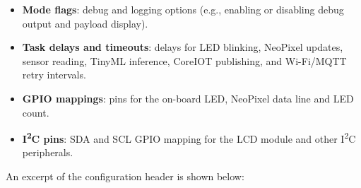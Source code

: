 \begin{itemize}
  \item \textbf{Mode flags}: debug and logging options (e.g., enabling or disabling debug output and payload display).
  \item \textbf{Task delays and timeouts}: delays for LED blinking, NeoPixel updates, sensor reading, TinyML inference, CoreIOT publishing, and Wi-Fi/MQTT retry intervals.
  \item \textbf{GPIO mappings}: pins for the on-board LED, NeoPixel data line and LED count.
  \item \textbf{I\textsuperscript{2}C pins}: SDA and SCL GPIO mapping for the LCD module and other I\textsuperscript{2}C peripherals.
\end{itemize}

An excerpt of the configuration header is shown below:

